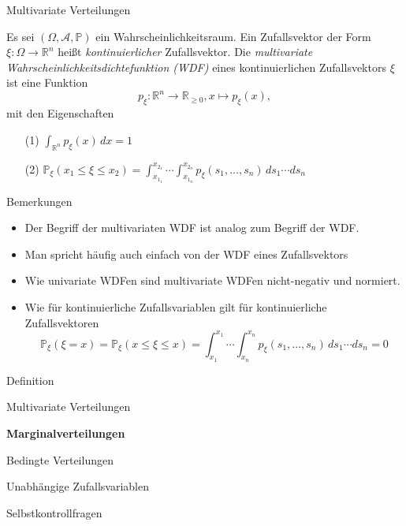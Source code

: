 \documentclass[
  8pt,
  ignorenonframetext,
]{beamer}
\providecommand{\tightlist}{%
  \setlength{\itemsep}{0pt}\setlength{\parskip}{0pt}}
\begin{document}
\begin{frame}{Multivariate Verteilungen}
\protect\hypertarget{multivariate-verteilungen-4}{}
\footnotesize
\begin{definition}
\justifying
Es sei $(\Omega,\mathcal{A},\mathbb{P})$ ein Wahrscheinlichkeitsraum. Ein 
Zufallsvektor der Form $\xi:\Omega \to \mathbb{R}^n$ heißt \textit{kontinuierlicher} 
Zufallsvektor. Die \textit{multivariate Wahrscheinlichkeitsdichtefunktion (WDF)} 
eines kontinuierlichen  Zufallsvektors $\xi$ ist eine Funktion
\begin{equation}
p_\xi : \mathbb{R}^n \to \mathbb{R}_{\ge 0}, x \mapsto p_\xi(x),
\end{equation}
mit den Eigenschaften
\begin{itemize}
\item[(1)] $\int_{\mathbb{R}^n} p_\xi(x)\,dx = 1$
\item[(2)] $\mathbb{P}_\xi(x_1 \le \xi \le x_2)
            = \int_{x_{1_1}}^{x_{2_1}} \cdots \int_{x_{1_n}}^{x_{2_n}} p_\xi(s_1,...,s_n)\,ds_1 \cdots ds_n$
\end{itemize}
\end{definition}

Bemerkungen

\begin{itemize}
\tightlist
\item
  Der Begriff der multivariaten WDF ist analog zum Begriff der WDF.
\item
  Man spricht häufig auch einfach von der WDF eines Zufallsvektors
\item
  Wie univariate WDFen sind multivariate WDFen nicht-negativ und
  normiert.
\item
  Wie für kontinuierliche Zufallsvariablen gilt für kontinuierliche
  Zufallsvektoren \begin{equation}
  \mathbb{P}_\xi(\xi = x)
  = \mathbb{P}_\xi(x \le \xi \le x)
  = \int_{x_1}^{x_1} \cdots \int_{x_n}^{x_n} p_\xi(s_1,...,s_n)\,ds_1 \cdots ds_n
  = 0
  \end{equation}
\end{itemize}
\end{frame}

\begin{frame}{}
\protect\hypertarget{section-7}{}
\large
{}
\vfill

Definition

Multivariate Verteilungen

\textbf{Marginalverteilungen}

Bedingte Verteilungen

Unabhängige Zufallsvariablen

Selbstkontrollfragen

\vfill
\end{frame}
\end{document}
